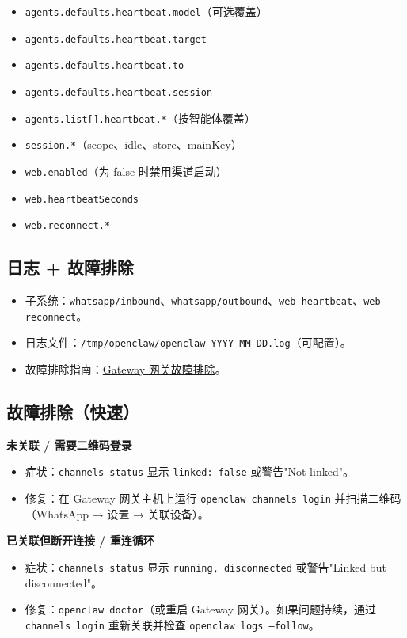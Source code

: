 \begin{itemize}
  \item \texttt{agents.defaults.heartbeat.model}（可选覆盖）
  \item \texttt{agents.defaults.heartbeat.target}
  \item \texttt{agents.defaults.heartbeat.to}
  \item \texttt{agents.defaults.heartbeat.session}
  \item \texttt{agents.list[].heartbeat.*}（按智能体覆盖）
  \item \texttt{session.*}（scope、idle、store、mainKey）
  \item \texttt{web.enabled}（为 false 时禁用渠道启动）
  \item \texttt{web.heartbeatSeconds}
  \item \texttt{web.reconnect.*}
\end{itemize}


\subsection{日志 + 故障排除}


\begin{itemize}
  \item 子系统：\texttt{whatsapp/inbound}、\texttt{whatsapp/outbound}、\texttt{web-heartbeat}、\texttt{web-reconnect}。
  \item 日志文件：\texttt{/tmp/openclaw/openclaw-YYYY-MM-DD.log}（可配置）。
  \item 故障排除指南：\href{/gateway/troubleshooting}{Gateway 网关故障排除}。
\end{itemize}


\subsection{故障排除（快速）}


\textbf{未关联 / 需要二维码登录}

\begin{itemize}
  \item 症状：\texttt{channels status} 显示 \texttt{linked: false} 或警告"Not linked"。
  \item 修复：在 Gateway 网关主机上运行 \texttt{openclaw channels login} 并扫描二维码（WhatsApp → 设置 → 关联设备）。
\end{itemize}


\textbf{已关联但断开连接 / 重连循环}

\begin{itemize}
  \item 症状：\texttt{channels status} 显示 \texttt{running, disconnected} 或警告"Linked but disconnected"。
  \item 修复：\texttt{openclaw doctor}（或重启 Gateway 网关）。如果问题持续，通过 \texttt{channels login} 重新关联并检查 \texttt{openclaw logs --follow}。
\end{itemize}



